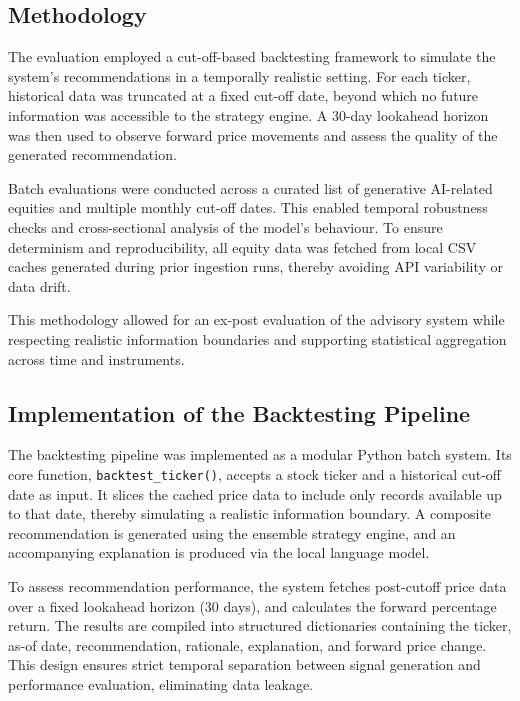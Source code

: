 \subsection{Methodology}

The evaluation employed a cut-off-based backtesting framework to simulate the system’s recommendations in a temporally realistic setting. For each ticker, historical data was truncated at a fixed cut-off date, beyond which no future information was accessible to the strategy engine. A 30-day lookahead horizon was then used to observe forward price movements and assess the quality of the generated recommendation.

Batch evaluations were conducted across a curated list of generative AI-related equities and multiple monthly cut-off dates. This enabled temporal robustness checks and cross-sectional analysis of the model’s behaviour. To ensure determinism and reproducibility, all equity data was fetched from local CSV caches generated during prior ingestion runs, thereby avoiding API variability or data drift.

This methodology allowed for an ex-post evaluation of the advisory system while respecting realistic information boundaries and supporting statistical aggregation across time and instruments.

\subsection{Implementation of the Backtesting Pipeline}

The backtesting pipeline was implemented as a modular Python batch system. Its core function, \texttt{backtest\_ticker()}, accepts a stock ticker and a historical cut-off date as input. It slices the cached price data to include only records available up to that date, thereby simulating a realistic information boundary. A composite recommendation is generated using the ensemble strategy engine, and an accompanying explanation is produced via the local language model.

To assess recommendation performance, the system fetches post-cutoff price data over a fixed lookahead horizon (30 days), and calculates the forward percentage return. The results are compiled into structured dictionaries containing the ticker, as-of date, recommendation, rationale, explanation, and forward price change. This design ensures strict temporal separation between signal generation and performance evaluation, eliminating data leakage.

